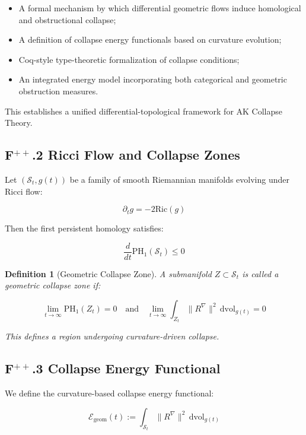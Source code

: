 \documentclass[11pt]{article}
\newtheorem{definition}[theorem]{Definition}
\begin{document}
\begin{itemize}
    \item A formal mechanism by which differential geometric flows induce homological and obstructional collapse;
    \item A definition of collapse energy functionals based on curvature evolution;
    \item Coq-style type-theoretic formalization of collapse conditions;
    \item An integrated energy model incorporating both categorical and geometric obstruction measures.
\end{itemize}

This establishes a unified differential-topological framework for AK Collapse Theory.

\subsection*{F$^{++}$.2 Ricci Flow and Collapse Zones}

Let \( (\mathcal{S}_t, g(t)) \) be a family of smooth Riemannian manifolds evolving under Ricci flow:

\[
\partial_t g = -2 \mathrm{Ric}(g)
\]

Then the first persistent homology satisfies:

\[
\frac{d}{dt} \mathrm{PH}_1(\mathcal{S}_t) \leq 0
\]

\begin{definition}[Geometric Collapse Zone]
A submanifold \( Z \subset \mathcal{S}_t \) is called a \emph{geometric collapse zone} if:

\[
\lim_{t \to \infty} \mathrm{PH}_1(Z_t) = 0
\quad \text{and} \quad
\lim_{t \to \infty} \int_{Z_t} \| R^\nabla \|^2 \, \mathrm{dvol}_{g(t)} = 0
\]

This defines a region undergoing curvature-driven collapse.
\end{definition}

\subsection*{F$^{++}$.3 Collapse Energy Functional}

We define the curvature-based collapse energy functional:

\[
\mathcal{E}_{\mathrm{geom}}(t) := \int_{\mathcal{S}_t} \| R^\nabla \|^2 \, \mathrm{dvol}_{g(t)}
\]
\end{document}
